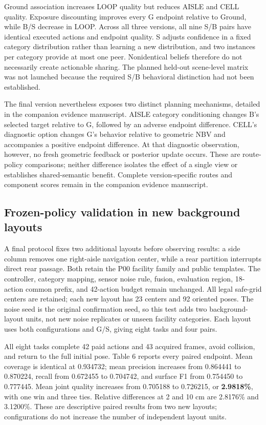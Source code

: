 \documentclass[pdflatex,sn-mathphys-num]{sn-jnl}
\begin{document}
Ground association increases LOOP quality but reduces AISLE and CELL quality. Exposure discounting improves every G endpoint relative to Ground, while B/S decrease in LOOP. Across all three versions, all nine S/B pairs have identical executed actions and endpoint quality. S adjusts confidence in a fixed category distribution rather than learning a new distribution, and two instances per category provide at most one peer. Nonidentical beliefs therefore do not necessarily create actionable sharing. The planned held-out scene-level matrix was not launched because the required S/B behavioral distinction had not been established.

The final version nevertheless exposes two distinct planning mechanisms, detailed in the companion evidence manuscript. AISLE category conditioning changes B's selected target relative to G, followed by an adverse endpoint difference. CELL's diagnostic option changes G's behavior relative to geometric NBV and accompanies a positive endpoint difference. At that diagnostic observation, however, no fresh geometric feedback or posterior update occurs. These are route-policy comparisons; neither difference isolates the effect of a single view or establishes shared-semantic benefit. Complete version-specific routes and component scores remain in the companion evidence manuscript.

\hypertarget{frozen-policy-validation-in-new-background-layouts}{%
\subsection{Frozen-policy validation in new background layouts}\label{frozen-policy-validation-in-new-background-layouts}}

A final protocol fixes two additional layouts before observing results: a side column removes one right-aisle navigation center, while a rear partition interrupts direct rear passage. Both retain the P00 facility family and public templates. The controller, category mapping, sensor noise rule, fusion, evaluation region, 18-action common prefix, and 42-action budget remain unchanged. All legal safe-grid centers are retained; each new layout has 23 centers and 92 oriented poses. The noise seed is the original confirmation seed, so this test adds two background-layout units, not new noise replicates or unseen facility categories. Each layout uses both configurations and G/S, giving eight tasks and four pairs.

All eight tasks complete 42 paid actions and 43 acquired frames, avoid collision, and return to the full initial pose. Table 6 reports every paired endpoint. Mean coverage is identical at 0.934732; mean precision increases from 0.864441 to 0.870224, recall from 0.672455 to 0.704742, and surface F1 from 0.754450 to 0.777445. Mean joint quality increases from 0.705188 to 0.726215, or \textbf{2.9818\%}, with one win and three ties. Relative differences at 2 and 10 cm are 2.8176\% and 3.1200\%. These are descriptive paired results from two new layouts; configurations do not increase the number of independent layout units.
\end{document}
